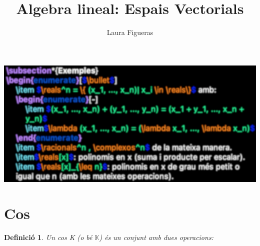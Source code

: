 \documentclass[a4paper, 11pt]{article}
\newtheorem*{definicio}{Definició}
\begin{document}
\title{Algebra lineal: Espais Vectorials}
\author{Laura Figueras}
\date{}
\maketitle

\thispagestyle{empty}
\setcounter{page}{0}


\begin{center}
	\includegraphics{LauraFigueras-1}
\end{center}

\newcommand{\Kcos}{\mathbb{K}}
\newcommand{\naturals}{\mathbb{N}}
\newcommand{\enters}{\mathbb{Z}}
\newcommand{\racionals}{\mathbb{Q}}
\newcommand{\reals}{\mathbb{R}}
\newcommand{\complexos}{\mathbb{C}}

\pagebreak

\section{Cos}
\begin{definicio}
	Un cos K (o bé $\Kcos$) és un conjunt amb dues operacions:
\end{definicio}
\end{document}
